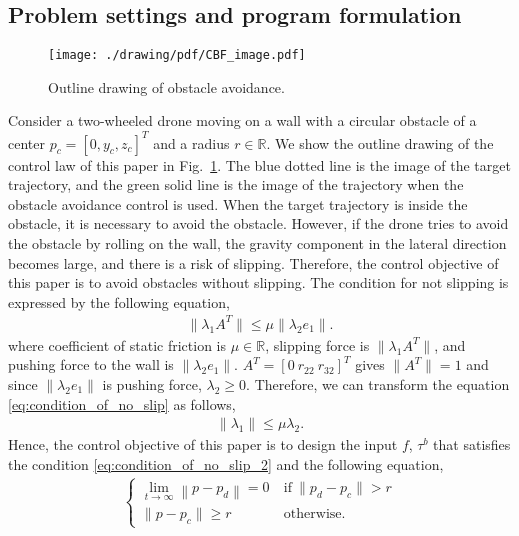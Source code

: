 \subsection{Problem settings and program formulation}
\label{subsec:problem_setting}
\begin{figure}[t]
    \centering
    \texttt{[image: ./drawing/pdf/CBF\_image.pdf]}
    \caption{Outline drawing of obstacle avoidance.}
    \label{fig:outline_drawing_of_obstacle_avoidance}
\end{figure}
Consider a two-wheeled drone moving on a wall with a circular obstacle of a center $ p_c = [0, y_c, z_c]^T $ and a radius $ r \in \mathbb{R} $.
We show the outline drawing of the control law of this paper in Fig.~\ref{fig:outline_drawing_of_obstacle_avoidance}.
The blue dotted line is the image of the target trajectory, and the green solid line is the image of the trajectory when the obstacle avoidance control is used.
When the target trajectory is inside the obstacle, it is necessary to avoid the obstacle.
However, if the drone tries to avoid the obstacle by rolling on the wall, the gravity component in the lateral direction becomes large, and there is a risk of slipping.
Therefore, the control objective of this paper is to avoid obstacles without slipping.
The condition for not slipping is expressed by the following equation,
\begin{align}
    \label{eq:condition_of_no_slip}
    \| \lambda_1 A^T \| \leq \mu \| \lambda_2 e_1 \|.
\end{align}
where coefficient of static friction is $ \mu \in \mathbb{R} $, slipping force is $ \| \lambda_1 A^T \| $, and pushing force to the wall is $ \| \lambda_2 e_1 \|$.
$ A^T = [0 ~ r_{22} ~ r_{32}]^T $ gives $ \| A^T \| = 1 $ and since $ \| \lambda_2 e_1 \| $ is pushing force, $ \lambda_2 \geq 0 $.
Therefore, we can transform the equation \eqref{eq:condition_of_no_slip} as follows,
\begin{align}
    \label{eq:condition_of_no_slip_2}
    \| \lambda_1 \| \leq  \mu \lambda_2.
\end{align}
Hence, the control objective of this paper is to design the input $ f $, $ \tau^b $ that satisfies the condition \eqref{eq:condition_of_no_slip_2} and the following equation,
\begin{align*}
    \begin{cases}
            \displaystyle \lim_{t \rightarrow \infty} 
            \left \| p - p_d \right \| = 0
        &~ {\mathrm{if} } ~ \| p_d - p_c \| > r  \\
        \| p - p_c \| \geq r &~ {\mathrm{otherwise} }.
    \end{cases}
\end{align*}
